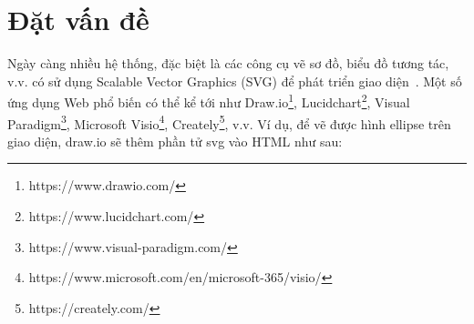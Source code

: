 \documentclass[a4paper, 12pt]{report}
\begin{document}


\renewcommand{\listfigurename}{DANH MỤC HÌNH ẢNH}
{
    \renewcommand{\cftloftitlefont}{\fontsize{16pt}{18pt}\selectfont\bfseries}
    \listoffigures
}
\newpage


\renewcommand{\listtablename}{DANH MỤC BẢNG}
{
    \renewcommand{\cftlottitlefont}{\fontsize{16pt}{18pt}\selectfont\bfseries}
    \listoftables
}
\newpage






\chapter{Đặt vấn đề}


Ngày càng nhiều hệ thống, đặc biệt là các công cụ vẽ sơ đồ, biểu đồ tương tác, v.v. có sử dụng Scalable Vector Graphics (SVG) để phát triển giao diện~\cite{w3techs_svg}.
Một số ứng dụng Web phổ biến có thể kể tới như Draw.io\footnote{https://www.drawio.com/}, Lucidchart\footnote{https://www.lucidchart.com/}, Visual Paradigm\footnote{https://www.visual-paradigm.com/}, Microsoft Visio\footnote{https://www.microsoft.com/en/microsoft-365/visio/}, Creately\footnote{https://creately.com/}, v.v. 
Ví dụ, để vẽ được hình ellipse trên giao diện, draw.io sẽ thêm phần tử svg vào HTML như sau:


\end{document}
